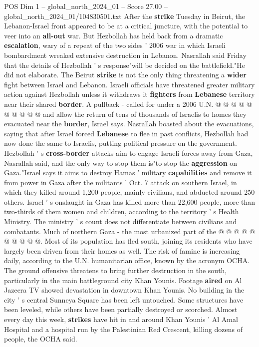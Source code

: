 \begin{textsample}{POS Dim 1 – global\_north\_2024\_01 – Score 27.00 – global\_north\_2024\_01/104830501.txt}
After the \textbf{strike} Tuesday in Beirut, the Lebanon-Israel front appeared to be at a critical juncture, with the potential to veer into an \textbf{all-out} war.
But Hezbollah has held back from a dramatic \textbf{escalation}, wary of a repeat of the two sides ' 2006 war in which Israeli bombardment wreaked extensive destruction in Lebanon.
Nasrallah said Friday that the details of Hezbollah ' s response"will be decided on the battlefield."He did not elaborate.
The Beirut \textbf{strike} is not the only thing threatening a \textbf{wider} fight between Israel and Lebanon.
Israeli officials have threatened greater military action against Hezbollah unless it withdraws it \textbf{fighters} from \textbf{Lebanese} territory near their shared \textbf{border}.
A pullback - called for under a 2006 U.N. @ @ @ @ @ @ @ @ @ @ and allow the return of tens of thousands of Israelis to homes they evacuated near the \textbf{border}, Israel says.
Nasrallah boasted about the evacuations, saying that after Israel forced \textbf{Lebanese} to flee in past conflicts, Hezbollah had now done the same to Israelis, putting political pressure on the government.
Hezbollah ' s \textbf{cross-border} attacks aim to engage Israeli forces away from Gaza, Nasrallah said, and the only way to stop them is"to stop the \textbf{aggression} on Gaza."Israel says it aims to destroy Hamas ' military \textbf{capabilities} and remove it from power in Gaza after the militants ' Oct. 7 attack on southern Israel, in which they killed around 1,200 people, mainly civilians, and abducted around 250 others.
Israel ' s onslaught in Gaza has killed more than 22,600 people, more than two-thirds of them women and children, according to the territory ' s Health Ministry.
The ministry ' s count does not differentiate between civilians and combatants.
Much of northern Gaza - the most urbanized part of the @ @ @ @ @ @ @ @ @ @.
Most of its population has fled south, joining its residents who have largely been driven from their homes as well.
The risk of famine is increasing daily, according to the U.N. humanitarian office, known by the acronym OCHA.
The ground offensive threatens to bring further destruction in the south, particularly in the main battleground city Khan Younis.
Footage \textbf{aired} on Al Jazeera TV showed devastation in downtown Khan Younis.
No building in the city ' s central Sunneya Square has been left untouched.
Some structures have been leveled, while others have been partially destroyed or scorched.
Almost every day this week, \textbf{strikes} have hit in and around Khan Younis ' Al Amal Hospital and a hospital run by the Palestinian Red Crescent, killing dozens of people, the OCHA said.

\end{textsample}
